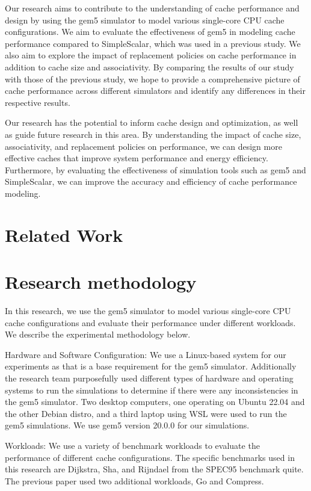 \documentclass[conference]{IEEEtran}
\begin{document}
Our research aims to contribute to the understanding of cache performance and design by using the gem5 simulator to model various single-core CPU cache configurations. We aim to evaluate the effectiveness of gem5 in modeling cache performance compared to SimpleScalar, which was used in a previous study. We also aim to explore the impact of replacement policies on cache performance in addition to cache size and associativity. By comparing the results of our study with those of the previous study, we hope to provide a comprehensive picture of cache performance across different simulators and identify any differences in their respective results.

Our research has the potential to inform cache design and optimization, as well as guide future research in this area. By understanding the impact of cache size, associativity, and replacement policies on performance, we can design more effective caches that improve system performance and energy efficiency. Furthermore, by evaluating the effectiveness of simulation tools such as gem5 and SimpleScalar, we can improve the accuracy and efficiency of cache performance modeling.

\section{Related Work}


\section{Research methodology}
In this research, we use the gem5 simulator to model various single-core CPU cache configurations and evaluate their performance under different workloads. We describe the experimental methodology below.

Hardware and Software Configuration:
We use a Linux-based system for our experiments as that is a base requirement for the gem5 simulator. Additionally the research team purposefully used different types of hardware and operating systems to run the simulations to determine if there were any inconsistencies in the gem5 simulator. Two desktop computers, one operating on Ubuntu 22.04 and the other Debian distro, and a third laptop using WSL were used to run the gem5 simulations. We use gem5 version 20.0.0 for our simulations.

Workloads:
We use a variety of benchmark workloads to evaluate the performance of different cache configurations. The specific benchmarks used in this research are Dijkstra, Sha, and Rijndael from the SPEC95 benchmark quite. The previous paper used two additional workloads, Go and Compress.
\end{document}
